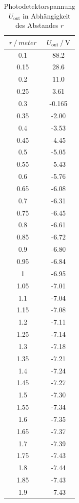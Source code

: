\begin{table}
  \centering
  \caption{Photodetektorspannung $U_{\mathrm{out}}$ in Abhängigkeit des Abstandes $r$}
  \label{tab:photodetektor}
  \begin{tabular}{cc}
    \toprule {$r \:/\: meter$} & {$U_{\mathrm{out}} \:/\: \si{\volt}$} \\
    \midrule
     0.1 & 88.2 \\
     0.15 & 28.6 \\
     0.2 & 11.0 \\
     0.25 & 3.61 \\
     0.3 & -0.165 \\
     0.35 & -2.00 \\
     0.4 & -3.53 \\
     0.45 & -4.45 \\
     0.5 & -5.05 \\
     0.55 & -5.43 \\
     0.6 & -5.76 \\
     0.65 & -6.08 \\
     0.7 & -6.31 \\
     0.75 & -6.45 \\
     0.8 & -6.61 \\
     0.85 & -6.72 \\
     0.9 & -6.80 \\
     0.95 & -6.84 \\
     1 & -6.95 \\
     1.05 & -7.01 \\
     1.1 & -7.04 \\
     1.15 & -7.08 \\
     1.2 & -7.11 \\
     1.25 & -7.14 \\
     1.3 & -7.18 \\
     1.35 & -7.21 \\
     1.4 & -7.24 \\
     1.45 & -7.27 \\
     1.5 & -7.30 \\
     1.55 & -7.34 \\
     1.6 & -7.35 \\
     1.65 & -7.37 \\
     1.7 & -7.39 \\
     1.75 & -7.43 \\
     1.8 & -7.44 \\
     1.85 & -7.43 \\
     1.9 & -7.43 \\
     \bottomrule
    \end{tabular}
   \end{table}

